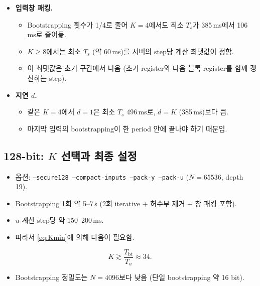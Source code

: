 \documentclass[11pt,a4paper]{article}
\begin{document}
\begin{itemize}
\begin{itemize}
  \item 곱셈은 5회로 고정되고, rotation만 $\log_2S$로 늘어남.
  \end{itemize}
\item \textbf{입력창 패킹.}
  \begin{itemize}
  \item Bootstrapping 횟수가 1/4로 줄어 $K=4$에서도 최소 $T_s$가 385\,ms에서 106\,ms로 줄어듦.
  \item $K\ge8$에서는 최소 $T_s$ (약 60\,ms)를 서버의 step당 계산 최댓값이 정함.
  \item 이 최댓값은 초기 구간에서 나옴 (초기 register와 다음 블록 register를 함께 갱신하는 step).
  \end{itemize}
\item \textbf{지연 $d$.}
  \begin{itemize}
  \item 같은 $K=4$에서 $d=1$은 최소 $T_s$ 496\,ms로, $d=K$ (385\,ms)보다 큼.
  \item 마지막 입력의 bootstrapping이 한 period 안에 끝나야 하기 때문임.
  \end{itemize}
\end{itemize}

\subsection{128-bit: $K$ 선택과 최종 설정}\label{sec:128}
\begin{itemize}
\item 옵션: \texttt{--secure128 --compact-inputs --pack-y --pack-u} ($N=65536$, depth 19).
\item Bootstrapping 1회 약 5--7\,s (2회 iterative + 허수부 제거 + 창 패킹 포함).
\item $u$ 계산 step당 약 150--200\,ms.
\item 따라서 \eqref{eq:Kmin}에 의해 다음이 필요함.
\end{itemize}
\begin{equation}
K\gtrsim\frac{T_{\mathrm{bt}}}{T_u}\approx34 .
\end{equation}
\begin{itemize}
\item Bootstrapping 정밀도는 $N=4096$보다 낮음 (단일 bootstrapping 약 16 bit).
\end{itemize}
\end{document}
